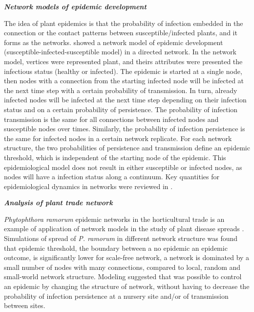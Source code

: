 \textit{\textbf{Network models of epidemic development}}
 
The idea of plant epidemics is that the probability of infection embedded in the connection or the contact patterns between susceptible/infected plants, and it forms as the networks.  showed a network model of epidemic development (susceptible-infected-susceptible model) in a directed network. In the network model, vertices were represented plant, and theirs attributes were presented the infectious status (healthy or infected). The epidemic is started at a single node, then nodes with a connection from the starting infected node will be infected at the next time step with a certain probability of transmission. In turn, already infected nodes will be infected at the next time step depending on their infection status and on a certain probability of persistence. The probability of infection transmission is the same for all connections between infected nodes and susceptible nodes over times. Similarly, the probability of infection persistence is the same for infected nodes in a certain network replicate. For each network structure, the two probabilities of persistence and transmission define an epidemic threshold, which is independent of the starting node of the epidemic. This epidemiological model does not result in either susceptible or infected nodes, as nodes will have a infection status along a continuum. Key quantities for epidemiological dynamics in networks were reviewed in .

\textit{\textbf{Analysis of plant trade network}}

\textit{Phytophthora ramorum} epidemic networks in the horticultural trade is an example of application of network models in the study of plant disease spreads . Simulations of spread of \textit{P. ramorum} in different network structure was found that epidemic threshold, the boundary between a no epidemic an epidemic outcome, is significantly lower for scale-free network, a network is dominated by a small number of nodes with many connections, compared to local, random and small-world network structure. Modeling suggested that was possible to control an epidemic by changing the structure of network, without having to decrease the probability of infection persistence at a nursery site and/or of transmission between sites.

